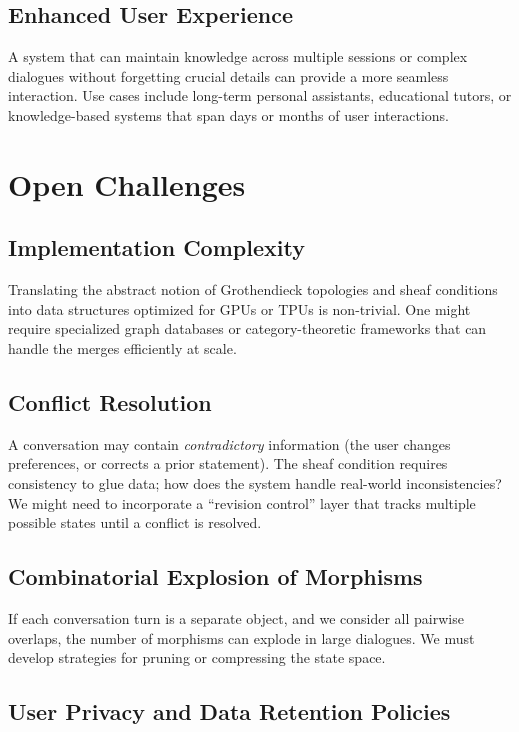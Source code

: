 \documentclass{article}
\begin{document}
\subsection{Enhanced User Experience}

A system that can maintain knowledge across multiple sessions or complex dialogues without forgetting crucial details can provide a more seamless interaction. Use cases include long-term personal assistants, educational tutors, or knowledge-based systems that span days or months of user interactions.

\section{Open Challenges}
\label{sec:open_challenges}

\subsection{Implementation Complexity}

Translating the abstract notion of Grothendieck topologies and sheaf conditions into data structures optimized for GPUs or TPUs is non-trivial. One might require specialized graph databases or category-theoretic frameworks that can handle the merges efficiently at scale.

\subsection{Conflict Resolution}

A conversation may contain \emph{contradictory} information (the user changes preferences, or corrects a prior statement). The sheaf condition requires consistency to glue data; how does the system handle real-world inconsistencies? We might need to incorporate a “revision control” layer that tracks multiple possible states until a conflict is resolved.

\subsection{Combinatorial Explosion of Morphisms}

If each conversation turn is a separate object, and we consider all pairwise overlaps, the number of morphisms can explode in large dialogues. We must develop strategies for pruning or compressing the state space.

\subsection{User Privacy and Data Retention Policies}
\end{document}
